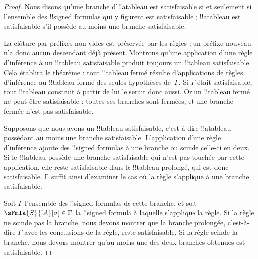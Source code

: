 \documentclass[../../../include/open-logic-section]{subfiles}
\begin{document}
\begin{proof}
Nous disons qu'une branche d'!!a{tableau} est satisfaisable si et
seulement si l'ensemble des !!{signed formula}s qui y figurent est
satisfaisable ; !!a{tableau} est satisfaisable s'il possède au moins
une branche satisfaisable.

La clôture par préfixes non vides est préservée par les règles ; un préfixe nouveau n’a donc aucun descendant déjà présent. Montrons qu'une application d'une règle d'inférence à un !!{tableau}
satisfaisable produit toujours un !!{tableau} satisfaisable. Cela
établira le théorème : tout !!{tableau} fermé résulte d'applications
de règles d'inférence au !!{tableau} formé des seules hypothèses
de~$\Gamma$. Si $\Gamma$ était satisfaisable, tout !!{tableau}
construit à partir de lui le serait donc aussi. Or un !!{tableau}
fermé ne peut être satisfaisable : toutes ses branches sont fermées,
et une branche fermée n'est pas satisfaisable.

Supposons que nous ayons un !!{tableau} satisfaisable, c'est-à-dire
!!a{tableau} possédant au moins une branche satisfaisable. L'application d'une règle
d'inférence ajoute des !!{signed formula}s à une branche ou scinde
celle-ci en deux. Si le !!{tableau} possède une branche satisfaisable
qui n'est pas touchée par
cette application, elle reste satisfaisable dans le !!{tableau}
prolongé, qui est donc satisfaisable. Il suffit ainsi d'examiner le
cas où la règle s'applique à une branche satisfaisable.

Soit $\Gamma$ l'ensemble des !!{signed formula}s de cette branche, et
soit $\sFmla{S}{!A}[\sigma] \in \Gamma$ la !!{signed formula} à laquelle
s'applique la règle. Si la règle ne scinde pas la branche, nous devons
montrer que la branche prolongée, c'est-à-dire $\Gamma$ avec les
conclusions de la règle, reste satisfaisable. Si la règle scinde la
branche, nous devons montrer qu'au moins une des deux branches
obtenues est satisfaisable.


\end{proof}
\end{document}
